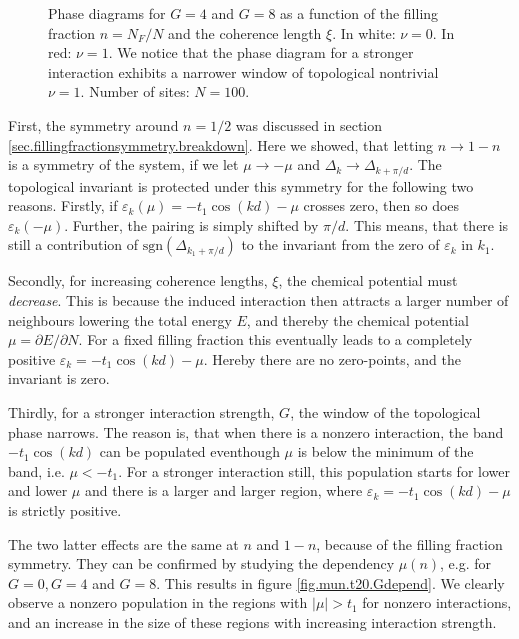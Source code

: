 \begin{figure}
\begin{center}

\caption{Phase diagrams for $G = 4$ and $G = 8$ as a function of the filling fraction $n = N_F/N$ and the coherence length $\xi$. In white: $\nu = 0$. In red: $\nu = 1$. We notice that the phase diagram for a stronger interaction exhibits a narrower window of topological nontrivial $\nu = 1$. Number of sites: $N = 100$. }
\label{fig.phasediagram.t20}
\end{center}
\end{figure}

First, the symmetry around $n = 1/2$ was discussed in section \ref{sec.fillingfractionsymmetry.breakdown}. Here we showed, that letting $n\to 1 - n$ is a symmetry of the system, if we let $\mu \to -\mu$ and $\Delta_{k} \to \Delta_{k + \pi/d}$. The topological invariant is protected under this symmetry for the following two reasons. Firstly, if $\varepsilon_k(\mu) = -t_1\cos(kd) - \mu$ crosses zero, then so does $\varepsilon_k(-\mu)$. Further, the pairing is simply shifted by $\pi / d$. This means, that there is still a contribution of $\text{sgn}(\Delta_{k_1+\pi/d})$ to the invariant from the zero of $\varepsilon_k$ in $k_1$.

Secondly, for increasing coherence lengths, $\xi$, the chemical potential must \textit{decrease}. This is because the induced interaction then attracts a larger number of neighbours lowering the total energy $E$, and thereby the chemical potential $\mu = \partial E / \partial N$. For a fixed filling fraction this eventually leads to a completely positive $\varepsilon_k = -t_1\cos(kd) - \mu$. Hereby there are no zero-points, and the invariant is zero. 

Thirdly, for a stronger interaction strength, $G$, the window of the topological phase narrows. The reason is, that when there is a nonzero interaction, the band $-t_1\cos(kd)$ can be populated eventhough $\mu$ is below the minimum of the band, i.e. $\mu < -t_1$. For a stronger interaction still, this population starts for lower and lower $\mu$ and there is a larger and larger region, where $\varepsilon_k = -t_1\cos(kd) - \mu$ is strictly positive.

The two latter effects are the same at $n$ and $1 - n$, because of the filling fraction symmetry. They can be confirmed by studying the dependency $\mu(n)$, e.g. for $G = 0, G = 4$ and $G = 8$. This results in figure \ref{fig.mun.t20.Gdepend}. We clearly observe a nonzero population in the regions with $|\mu| > t_1$ for nonzero interactions, and an increase in the size of these regions with increasing interaction strength. 

